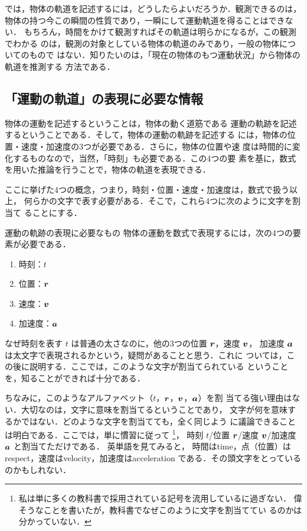         では，物体の軌道を記述するには，どうしたらよいだろうか．観測できるのは，
        物体の持つ今この瞬間の性質であり，一瞬にして運動軌道を得ることはできない．
        もちろん，時間をかけて観測すればその軌道は明らかになるが，この観測でわかる
        のは，観測の対象としている物体の軌道のみであり，一般の物体についてのもので
        はない．知りたいのは，「現在の物体のもつ運動状況」から物体の軌道を推測する
        方法である．

        \subsection{「運動の軌道」の表現に必要な情報}
        物体の運動を記述するということは，物体の動く道筋である
        運動の軌跡を記述するということである．そして，物体の運動の軌跡を記述する
        には，物体の位置・速度・加速度の3つが必要である．さらに，物体の位置や速
        度は時間的に変化するものなので，当然，「時刻」も必要である．この4つの要
        素を基に，数式を用いた推論を行うことで，物体の軌道を表現できる．

        ここに挙げた4つの概念，つまり，時刻・位置・速度・加速度は，数式で扱う以上，
        何らかの文字で表す必要がある．そこで，これら4つに次のように文字を割当て
        ることにする．
        \begin{myshadebox}{運動の軌跡の表現に必要なもの}
            物体の運動を数式で表現するには，次の4つの要素が必要である．
            \begin{enumerate}
                \item 時刻：$t$
                \item 位置：$\boldsymbol{r}$
                \item 速度：$\boldsymbol{v}$
                \item 加速度：$\boldsymbol{a}$
            \end{enumerate}
        \end{myshadebox}

        なぜ時刻を表す $t$ は普通の太さなのに，他の3つの位置 $\boldsymbol{r}$，速度 $\boldsymbol{v}$，
        加速度 $\boldsymbol{a}$ は太文字で表現されるかという，疑問があることと思う．これに
        ついては，この後に説明する．ここでは，このような文字が割当てられている
        ということを，知ることができれば十分である．

        ちなみに，このようなアルファベット（$t$，$\boldsymbol{r}$，$\boldsymbol{v}$，$\boldsymbol{a}$）を割
        当てる強い理由はない．大切なのは，文字に意味を割当てるということであり，
        文字が何を意味するかではない．どのような文字を割当てても，全く同じよう
        に議論できることは明白である．ここでは，単に慣習に従って
            \footnote{
                私は単に多くの教科書で採用されている記号を流用しているに過ぎない．
                偉そうなことを書いたが，教科書でなぜこのように文字を割当ててい
                るのかは分かっていない．
            }，
        時刻 $t$/位置 $\boldsymbol{r}$/速度 $\boldsymbol{v}$/加速度 $\boldsymbol{a}$ と割当てただけである．
        英単語を見てみると，
        時間はtime，点（位置）はrespect，速度はvelocity，加速度はacceleration
        である．その頭文字をとっているのかもしれない．

